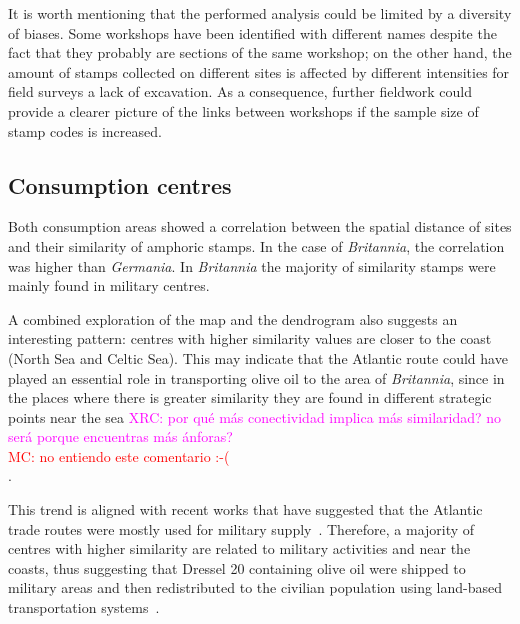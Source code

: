 \documentclass[review]{elsarticle}
\newcommand{\memo}[2]{\textcolor{#1}{#2}}
\newcommand{\maria}[1]{\memo{red}{MC: #1\\}}
\newcommand{\xavi}[1]{\memo{magenta}{XRC: #1\\}}
\begin{document}


It is worth mentioning that the performed analysis could be limited by a diversity of biases. Some workshops have been identified with different names despite the fact that they probably are sections of the same workshop; on the other hand, the amount of stamps collected on different sites is affected by different intensities for field surveys a lack of excavation. As a consequence, further fieldwork could provide a clearer picture of the links between workshops if the sample size of stamp codes is increased.

\subsection{Consumption centres}

Both consumption areas showed a correlation between the spatial distance of sites and their similarity of amphoric stamps. In the case of  \textit{Britannia}, the correlation was higher than \textit{Germania}. In \textit{Britannia} the majority of similarity stamps were mainly found in military centres.  


A combined exploration of the map and the dendrogram also suggests an interesting pattern: centres with higher similarity values are closer to the coast (North Sea and Celtic Sea). This may indicate that the Atlantic route could have played an essential role in transporting olive oil to the area of \textit{Britannia}, since in the places where there is greater similarity they are found in different strategic points near the sea
\xavi{por qué más conectividad implica más similaridad? no será porque encuentras más ánforas?}
\maria{no entiendo este comentario :-(}.

This trend is aligned with recent works that have suggested that the Atlantic trade routes were mostly used for military supply~\citep{remesal_annona_1986,remesal_provincial_2008,carreras_atlantic_2012,morillo_hispania_2016,rubio-campillo_provincias_2018}. Therefore, a majority of centres with higher similarity are related to military activities and near the coasts, thus suggesting that Dressel 20 containing olive oil were shipped to military areas and then redistributed to the civilian population using land-based transportation systems~\citep{carreras_britannia_1998,ayllon_olive_2018}.
\end{document}
